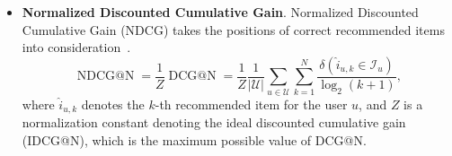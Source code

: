 \begin{itemize}


    \item \textbf{Normalized Discounted Cumulative Gain}. Normalized Discounted Cumulative Gain (NDCG) takes the positions of correct recommended items into consideration~\cite{jarvelin2000ir}.
        \begin{equation}
            \operatorname{NDCG@N} = \frac{1}{Z}\operatorname{DCG@N} = \frac{1}{Z} \frac{1}{|\mathcal{U}|}\sum_{u\in\mathcal{U}}\sum_{k=1}^{N}\frac{\delta(\hat{i}_{u,k}\in \mathcal{I}_{u})}{\operatorname{log}_2(k+1)},
        \end{equation}
        where $\hat{i}_{u,k}$ denotes the $k$-th recommended item for the user $u$, and $Z$ is a normalization constant denoting the ideal discounted cumulative gain (IDCG@N), which is the maximum possible value of DCG@N. 
\end{itemize}



